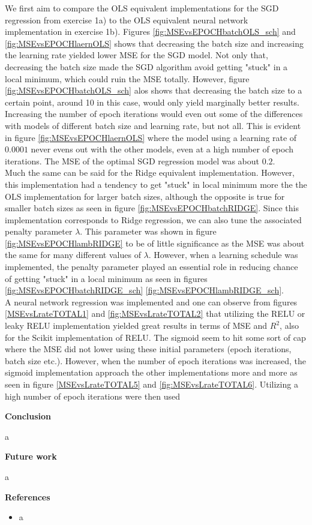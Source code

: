 \documentclass[12pt,a4paper]{article}
\begin{document}
\noindent We first aim to compare the OLS equivalent implementations for the SGD regression from exercise 1a) to the OLS equivalent neural network implementation in exercise 1b). Figures \ref{fig:MSEvsEPOCHbatchOLS_sch} and \ref{fig:MSEvsEPOCHlaernOLS} shows that decreasing the batch size and increasing the learning rate yielded lower MSE for the SGD model. Not only that, decreasing the batch size made the SGD algorithm avoid getting "stuck" in a local minimum, which could ruin the MSE totally. However, figure \ref{fig:MSEvsEPOCHbatchOLS_sch} alos shows that decreasing the batch size to a certain point, around 10 in this case, would only yield marginally better results. Increasing the number of epoch iterations would even out some of the differences with models of different batch size and learning rate, but not all. This is evident in figure \ref{fig:MSEvsEPOCHlaernOLS} where the model using a learning rate of $0.0001$ never evens out with the other models, even at a high number of epoch iterations. The MSE of the optimal SGD regression model was about $0.2$.
\\
Much the same can be said for the Ridge equivalent implementation. However, this implementation had a tendency to get "stuck" in local minimum more the the OLS implementation for larger batch sizes, although the opposite is true for smaller batch sizes as seen in figure \ref{fig:MSEvsEPOCHbatchRIDGE}. Since this implementation corresponds to Ridge regression, we can also tune the associated penalty parameter $\lambda$. This parameter was shown in figure \ref{fig:MSEvsEPOCHlambRIDGE} to be of little significance as the MSE was about the same for many different values of $\lambda$. However, when a learning schedule was implemented, the penalty parameter played an essential role in reducing chance of getting "stuck" in a local minimum as seen in figures \ref{fig:MSEvsEPOCHbatchRIDGE_sch} \ref{fig:MSEvsEPOCHlambRIDGE_sch}. 
\\
A neural network regression was implemented and one can observe from figures \ref{MSEvsLrateTOTAL1} and \ref{fig:MSEvsLrateTOTAL2} that utilizing the RELU or leaky RELU implementation yielded great results in terms of MSE and $R^2$, also for the Scikit implementation of RELU. The sigmoid seem to hit some sort of cap where the MSE did not lower using these initial parameters (epoch iterations, batch size etc.). However, when the number of epoch iterations was increased, the sigmoid implementation approach the other implementations more and more as seen in figure \ref{MSEvsLrateTOTAL5} and \ref{fig:MSEvsLrateTOTAL6}. Utilizing a high number of epoch iterations were then used 

\newpage

\begin{center}
\Large{\textbf{Conclusion}}
\end{center}

\noindent a

\newpage

\begin{center}
\Large{\textbf{Future work}}
\end{center}

\noindent a

\newpage

\begin{center}
\Large{\textbf{References}}
\end{center}

\begin{itemize}
  \item a
\end{itemize}
\end{document}
